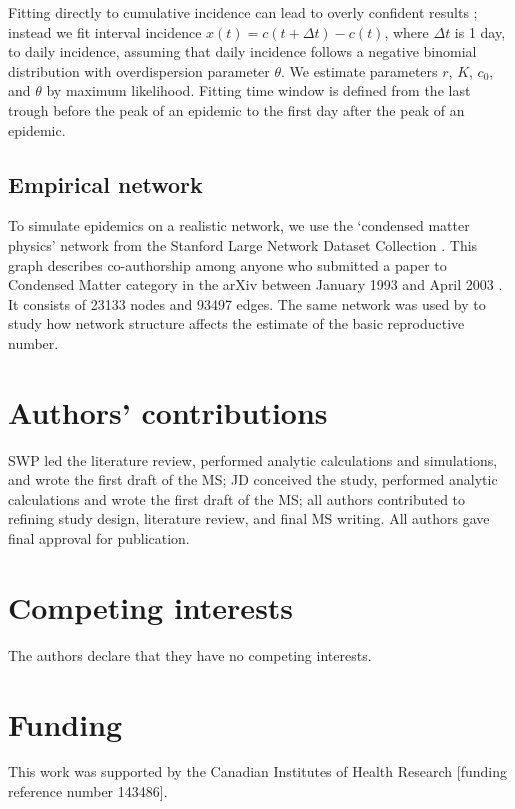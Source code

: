 \documentclass[12pt]{article}
\begin{document}
Fitting directly to cumulative incidence can lead to overly confident results \citep{king2015avoidable}; instead we fit interval incidence $x(t) = c(t + \Delta t) - c(t)$, where $\Delta t$ is 1 day, to daily incidence, assuming that daily incidence follows a negative binomial distribution with overdispersion parameter $\theta$.
We estimate parameters $r$, $K$, $c_0$, and $\theta$ by maximum likelihood.
Fitting time window is defined from the last trough before the peak of an epidemic to the first day after the peak of an epidemic.

\subsection{Empirical network}

To simulate epidemics on a realistic network, we use the `condensed matter physics' network from the Stanford Large Network Dataset Collection \citep{leskovec2016snap}.
This graph describes co-authorship among anyone who submitted a paper to Condensed Matter category in the arXiv between January 1993 and April 2003 \citep{leskovec2007graph}.
It consists of 23133 nodes and 93497 edges.
The same network was used by \cite{trapman2016inferring} to study how network structure affects the estimate of the basic reproductive number.

\section*{Authors' contributions}

SWP led the literature review, performed analytic calculations and simulations, and wrote the first draft of the MS; JD conceived the study, performed analytic calculations and wrote the first draft of the MS; all authors contributed to refining study design, literature review, and final MS writing. All authors gave final approval for publication. 

\section*{Competing interests}

The authors declare that they have no competing interests.

\section*{Funding}

This work was supported by the Canadian Institutes of Health Research [funding reference number 143486].

\pagebreak


\end{document}
